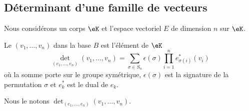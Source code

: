 \subsection{Déterminant d'une famille de vecteurs}

Nous considérons un corps \( \eK\) et l'espace vectoriel \( E\) de dimension \( n\) sur \( \eK\).

\begin{definition}\label{DEFooODDFooSNahPb}
    Le  \( (v_1,\ldots, v_n)\) dans la base \( B\) est l'élément de \( \eK\)
    \begin{equation}        \label{EQooOJEXooXUpwfZ}
        \det_{(e_1,\ldots, e_n)}(v_1,\ldots, v_n)=\sum_{\sigma\in S_n}\epsilon(\sigma)\prod_{i=1}^ne^*_{\sigma(i)}(v_i)
    \end{equation}
    où la somme porte sur le groupe symétrique, \( \epsilon(\sigma)\) est la signature de la permutation \( \sigma\) et \( e_k^*\) est le dual de \( e_k\).

    Nous le notons \( \det_{(e_1,\ldots, e_n)}(v_1,\ldots, v_n)\).
\end{definition}

